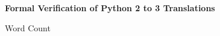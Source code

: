 \begin{titlepage}
    \begin{center}
        \vspace*{10cm}

        \Huge
        \textbf{Formal Verification of Python 2 to 3 Translations}

        \vspace*{0.5cm}

        \Large
        Word Count
    \end{center}
\end{titlepage}
